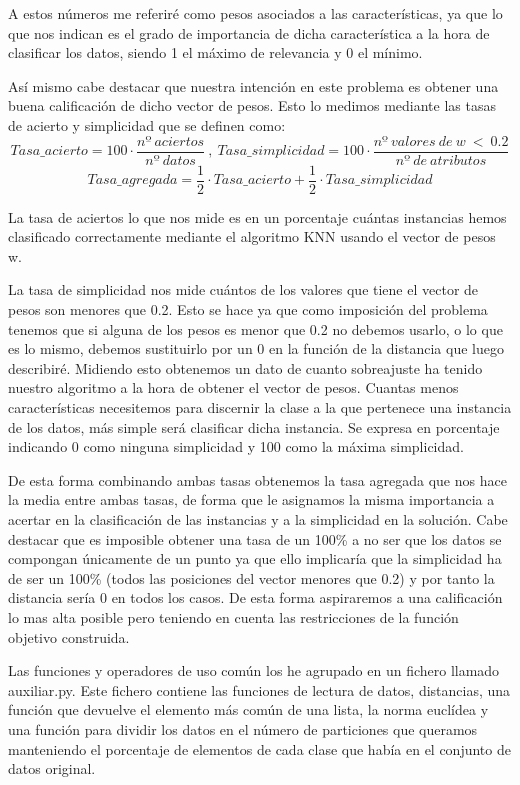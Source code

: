 \documentclass[12pt,a4paper]{article}
\begin{document}
	A estos números me referiré como pesos asociados a las características, ya que lo que nos indican es el grado de importancia de dicha característica a la hora de clasificar los datos, siendo 1 el máximo de relevancia y 0 el mínimo.

	Así mismo cabe destacar que nuestra intención en este problema es obtener una buena calificación de dicho vector de pesos. Esto lo medimos mediante las tasas de acierto y simplicidad que se definen como:
	$$Tasa\_acierto = 100\cdot \frac{nº  \ aciertos}{nº \ datos} \ , \ Tasa\_simplicidad = 100\cdot \frac{nº \ valores \ de \ w \ < \ 0.2}{nº \ de \ atributos}$$
	$$Tasa\_agregada = \frac{1}{2}\cdot Tasa\_acierto + \frac{1}{2}\cdot Tasa\_simplicidad$$

	La tasa de aciertos lo que nos mide es en un porcentaje cuántas instancias hemos clasificado correctamente mediante el algoritmo KNN usando el vector de pesos w.

	La tasa de simplicidad nos mide cuántos de los valores que tiene el vector de pesos son menores que 0.2. Esto se hace ya que como imposición del problema tenemos que si alguna de los pesos es menor que 0.2 no debemos usarlo, o lo que es lo mismo, debemos sustituirlo por un 0 en la función de la distancia que luego describiré. Midiendo esto obtenemos un dato de cuanto sobreajuste ha tenido nuestro algoritmo a la hora de obtener el vector de pesos. Cuantas menos características necesitemos para discernir la clase a la que pertenece una instancia de los datos, más simple será clasificar dicha instancia. Se expresa en porcentaje indicando 0 como ninguna simplicidad y 100 como la máxima simplicidad.

	De esta forma combinando ambas tasas obtenemos la tasa agregada que nos hace la media entre ambas tasas, de forma que le asignamos la misma importancia a acertar en la clasificación de las instancias y a la simplicidad en la solución. Cabe destacar que es imposible obtener una tasa de un 100\% a no ser que los datos se compongan únicamente de un punto ya que ello implicaría que la simplicidad ha de ser un 100\% (todos las posiciones del vector menores que 0.2) y por tanto la distancia sería 0 en todos los casos. De esta forma aspiraremos a una calificación lo mas alta posible pero teniendo en cuenta las restricciones de la función objetivo construida.

	Las funciones y operadores de uso común los he agrupado en un fichero llamado auxiliar.py. Este fichero contiene las funciones de lectura de datos, distancias, una función que devuelve el elemento más común de una lista, la norma euclídea y una función para dividir los datos en el número de particiones que queramos manteniendo el porcentaje de elementos de cada clase que había en el conjunto de datos original.
\end{document}
